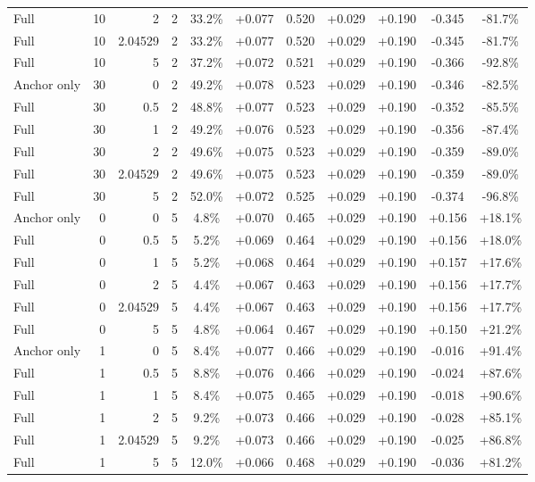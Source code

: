 \begin{table}[htbp]
\begin{tabular}{lrrrccccccc}
Full & 10 & 2 & 2 & 33.2\% & +0.077 & 0.520 & +0.029 & +0.190 & -0.345 & -81.7\% \\
Full & 10 & 2.04529 & 2 & 33.2\% & +0.077 & 0.520 & +0.029 & +0.190 & -0.345 & -81.7\% \\
Full & 10 & 5 & 2 & 37.2\% & +0.072 & 0.521 & +0.029 & +0.190 & -0.366 & -92.8\% \\
Anchor only & 30 & 0 & 2 & 49.2\% & +0.078 & 0.523 & +0.029 & +0.190 & -0.346 & -82.5\% \\
Full & 30 & 0.5 & 2 & 48.8\% & +0.077 & 0.523 & +0.029 & +0.190 & -0.352 & -85.5\% \\
Full & 30 & 1 & 2 & 49.2\% & +0.076 & 0.523 & +0.029 & +0.190 & -0.356 & -87.4\% \\
Full & 30 & 2 & 2 & 49.6\% & +0.075 & 0.523 & +0.029 & +0.190 & -0.359 & -89.0\% \\
Full & 30 & 2.04529 & 2 & 49.6\% & +0.075 & 0.523 & +0.029 & +0.190 & -0.359 & -89.0\% \\
Full & 30 & 5 & 2 & 52.0\% & +0.072 & 0.525 & +0.029 & +0.190 & -0.374 & -96.8\% \\
Anchor only & 0 & 0 & 5 & 4.8\% & +0.070 & 0.465 & +0.029 & +0.190 & +0.156 & +18.1\% \\
Full & 0 & 0.5 & 5 & 5.2\% & +0.069 & 0.464 & +0.029 & +0.190 & +0.156 & +18.0\% \\
Full & 0 & 1 & 5 & 5.2\% & +0.068 & 0.464 & +0.029 & +0.190 & +0.157 & +17.6\% \\
Full & 0 & 2 & 5 & 4.4\% & +0.067 & 0.463 & +0.029 & +0.190 & +0.156 & +17.7\% \\
Full & 0 & 2.04529 & 5 & 4.4\% & +0.067 & 0.463 & +0.029 & +0.190 & +0.156 & +17.7\% \\
Full & 0 & 5 & 5 & 4.8\% & +0.064 & 0.467 & +0.029 & +0.190 & +0.150 & +21.2\% \\
Anchor only & 1 & 0 & 5 & 8.4\% & +0.077 & 0.466 & +0.029 & +0.190 & -0.016 & +91.4\% \\
Full & 1 & 0.5 & 5 & 8.8\% & +0.076 & 0.466 & +0.029 & +0.190 & -0.024 & +87.6\% \\
Full & 1 & 1 & 5 & 8.4\% & +0.075 & 0.465 & +0.029 & +0.190 & -0.018 & +90.6\% \\
Full & 1 & 2 & 5 & 9.2\% & +0.073 & 0.466 & +0.029 & +0.190 & -0.028 & +85.1\% \\
Full & 1 & 2.04529 & 5 & 9.2\% & +0.073 & 0.466 & +0.029 & +0.190 & -0.025 & +86.8\% \\
Full & 1 & 5 & 5 & 12.0\% & +0.066 & 0.468 & +0.029 & +0.190 & -0.036 & +81.2\% \\

\end{tabular}
\end{table}
